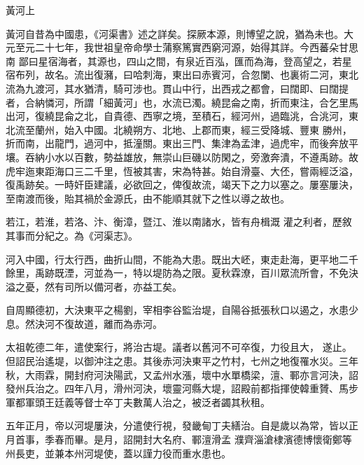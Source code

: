 
\begin{pinyinscope}

 黃河上



 黃河自昔為中國患，《河渠書》述之詳矣。探厥本源，則博望之說，猶為未也。大元至元二十七年，我世祖皇帝命學士蒲察篤實西窮河源，始得其詳。今西蕃朵甘思南
 鄙曰星宿海者，其源也，四山之間，有泉近百泓，匯而為海，登高望之，若星宿布列，故名。流出復瀦，曰哈刺海，東出曰赤賓河，合忽闌、也裏術二河，東北流為九渡河，其水猶清，騎可涉也。貫山中行，出西戎之都會，曰闊即、曰闊提者，合納憐河，所謂「細黃河」也，水流已濁。繞昆侖之南，折而東注，合乞里馬出河，復繞昆侖之北，自貴德、西寧之境，至積石，經河州，過臨洮，合洮河，東北流至蘭州，始入中國。北繞朔方、北地、上郡而東，經三受降城、豐東
 勝州，折而南，出龍門，過河中，抵潼關。東出三門、集津為孟津，過虎牢，而後奔放平壤。吞納小水以百數，勢益雄放，無崇山巨磯以防閑之，旁激奔潰，不遵禹跡。故虎牢迤東距海口三二千里，恆被其害，宋為特甚。始自滑臺、大伾，嘗兩經泛溢，復禹跡矣。一時奸臣建議，必欲回之，俾復故流，竭天下之力以塞之。屢塞屢決，至南渡而後，貽其禍於金源氏，由不能順其就下之性以導之故也。



 若江，若淮，若洛、汴、衡漳，暨江、淮以南諸水，皆有舟楫溉
 灌之利者，歷敘其事而分紀之。為《河渠志》。



 河入中國，行太行西，曲折山間，不能為大患。既出大岯，東走赴海，更平地二千餘里，禹跡既湮，河並為一，特以堤防為之限。夏秋霖潦，百川眾流所會，不免決溢之憂，然有司所以備河者，亦益工矣。



 自周顯德初，大決東平之楊劉，宰相李谷監治堤，自陽谷抵張秋口以遏之，水患少息。然決河不復故道，離而為赤河。



 太祖乾德二年，遣使案行，將治古堤。議者以舊河不可卒復，力役且大，
 遂止。但詔民治遙堤，以御沖注之患。其後赤河決東平之竹村，七州之地復罹水災。三年秋，大雨霖，開封府河決陽武，又孟州水漲，壞中水單橋梁，澶、鄆亦言河決，詔發州兵治之。四年八月，滑州河決，壞靈河縣大堤，詔殿前都指揮使韓重贇、馬步軍都軍頭王廷義等督士卒丁夫數萬人治之，被泛者蠲其秋租。



 五年正月，帝以河堤屢決，分遣使行視，發畿甸丁夫繕治。自是歲以為常，皆以正月首事，季春而畢。是月，詔開封大名府、鄆澶滑孟
 濮齊淄滄棣濱德博懷衛鄭等州長吏，並兼本州河堤使，蓋以謹力役而重水患也。




\end{pinyinscope}
